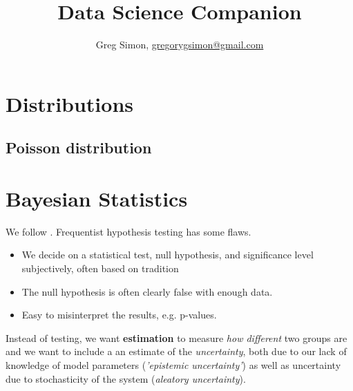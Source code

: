 \documentclass[12pt]{article}
\title{Data Science Companion}
\author{Greg Simon, \url{gregorygsimon@gmail.com}}
\begin{document}
\maketitle



\tableofcontents
\newpage

\section{Distributions}
\newrefsection

\subsection{Poisson distribution}


\printbibliography[heading=subbibnumbered]
\pagebreak

\section{Bayesian Statistics}
\newrefsection

We follow \cite{Fonnesbeck2019}. Frequentist hypothesis testing has some flaws.
\begin{itemize}
\item We decide on a statistical test, null hypothesis, and significance level
  subjectively, often based on tradition
\item The null hypothesis is often clearly false with enough data.
\item Easy to misinterpret the results, e.g. p-values.
\end{itemize}

Instead of testing, we want {\bf estimation} to measure {\sl how different} two
groups are and we want to include a an estimate of the {\sl uncertainty}, both
due to our lack of knowledge of model parameters ({\sl 'epistemic uncertainty'})
as well as uncertainty due to stochasticity of the system ({\sl aleatory
  uncertainty}). 
\end{document}
